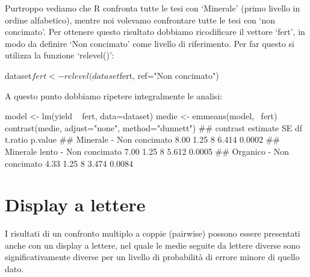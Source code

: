 \documentclass[a4paper,12pt,oneside]{book}
\newenvironment{Shaded}{}{}
\newcommand{\KeywordTok}[1]{#1}
\newcommand{\DataTypeTok}[1]{#1}
\newcommand{\StringTok}[1]{#1}
\newcommand{\CommentTok}[1]{#1}
\newcommand{\OperatorTok}[1]{#1}
\newcommand{\NormalTok}[1]{#1}
\begin{document}
\normalsize

Purtroppo vediamo che R confronta tutte le tesi con `Minerale' (primo livello in ordine alfabetico), mentre noi volevamo confrontare tutte le tesi con `non concimato'. Per ottenere questo risultato dobbiamo ricodificare il vettore `fert', in modo da definire `Non concimato' come livello di riferimento. Per far questo si utilizza la funzione `relevel()':

\begin{Shaded}
\begin{Highlighting}[]
\NormalTok{dataset}\OperatorTok{$}\NormalTok{fert <-}\StringTok{ }\KeywordTok{relevel}\NormalTok{(dataset}\OperatorTok{$}\NormalTok{fert, }\DataTypeTok{ref=}\StringTok{"Non concimato"}\NormalTok{)}
\end{Highlighting}
\end{Shaded}

A questo punto dobbiamo ripetere integralmente le analisi:

\small

\begin{Shaded}
\begin{Highlighting}[]
\NormalTok{model <-}\StringTok{ }\KeywordTok{lm}\NormalTok{(yield }\OperatorTok{~}\StringTok{ }\NormalTok{fert, }\DataTypeTok{data=}\NormalTok{dataset)}
\NormalTok{medie <-}\StringTok{ }\KeywordTok{emmeans}\NormalTok{(model, }\OperatorTok{~}\NormalTok{fert)}
\KeywordTok{contrast}\NormalTok{(medie, }\DataTypeTok{adjust=}\StringTok{"none"}\NormalTok{, }\DataTypeTok{method=}\StringTok{"dunnett"}\NormalTok{)}
\CommentTok{##  contrast                       estimate   SE df t.ratio p.value}
\CommentTok{##  Minerale - Non concimato           8.00 1.25  8 6.414   0.0002 }
\CommentTok{##  Minerale lento - Non concimato     7.00 1.25  8 5.612   0.0005 }
\CommentTok{##  Organico - Non concimato           4.33 1.25  8 3.474   0.0084}
\end{Highlighting}
\end{Shaded}

\normalsize

\hypertarget{display-a-lettere}{%
\section{Display a lettere}\label{display-a-lettere}}

I risultati di un confronto multiplo a coppie (pairwise) possono essere presentati anche con un display a lettere, nel quale le medie seguite da lettere diverse sono significativamente diverse per un livello di probabilità di errore minore di quello dato.
\end{document}
